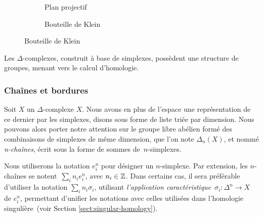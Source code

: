 \begin{exemple}
\begin{figure}[H]
\begin{subfigure}[t]{0.3\textwidth}
\caption{Plan projectif}
\label{tkz:proj-plane-simp}
\end{subfigure}
\begin{subfigure}[t]{0.3\textwidth}
\centering
{}
\caption{Bouteille de Klein}
\label{tkz:klein-bottle}
\end{subfigure}
\end{figure}
\end{exemple}

Les $\Delta$-complexes, construit à base de simplexes, possèdent une structure de groupes, menant vers le calcul d'homologie.

\subsubsection{Chaînes et bordures}
Soit $X$ un $\Delta$-complexe $X$. Nous avons en plus de l'espace une représentation de ce dernier par les simplexes, disons sous forme de liste triée par dimension. Nous pouvons alors porter notre attention sur le groupe libre abélien formé des combinaisons de simplexes de même dimension, que l'on note $\Delta_n(X)$, et nommé \emph{n-chaînes}, écrit sous la forme de sommes de~$n$-simplexes.

Nous utiliserons la notation $e_i^n$ pour désigner un $n$-simplexe. Par extension, les  $n$-chaînes se notent~$\sum_in_ie_i^n$, avec $n_i\in\mathbb{Z}$. Dans certains cas, il sera préférable d'utiliser la notation $\sum_in_i\sigma_i$, utilisant \emph{l'application caractéristique}~${\sigma_i:\Delta^n\to X}$ de $e_i^n$, permettant d'unifier les notations avec celles utilisées dans l'homologie singulière~(voir Section \ref{sect:singular-homology}).

